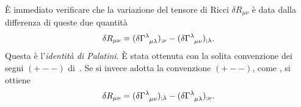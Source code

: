 È immediato verificare che la variazione del tensore di Ricci
$\delta R_{\mu\nu}$ è data dalla differenza di queste due quantità
\begin{equation}
  \delta R_{\mu\nu} = (\delta \tensor{\Gamma}{^{\lambda}_{\mu\lambda}})_{;\nu}
  - (\delta \tensor{\Gamma}{^{\lambda}_{\mu\nu}})_{;\lambda}.
\end{equation}
Questa è l'\emph{identità di Palatini}.  È stata
ottenuta con la solita convenzione dei segni $(+--)$
di~\textcite{weinberg:gravitation}.  Se si invece adotta la convenzione $(+--)$,
come \textcites{barone:relativita,landau:campi}, si ottiene
\begin{equation}
  \delta R_{\mu\nu} = (\delta \tensor{\Gamma}{^{\lambda}_{\mu\nu}})_{;\lambda} -
  (\delta \tensor{\Gamma}{^{\lambda}_{\mu\lambda}})_{;\nu}.
\end{equation}

